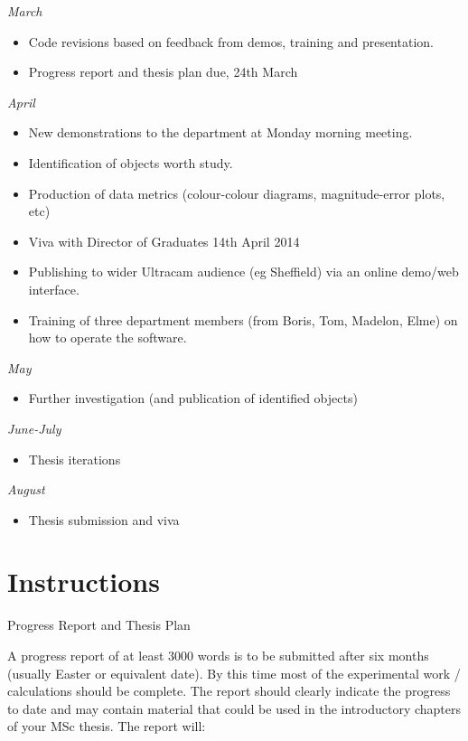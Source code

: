 \documentclass[a4paper,10pt]{article}
\begin{document}
\emph{March}
\begin{itemize} 
	\item Code revisions based on feedback from demos, training and presentation.
	\item Progress report and thesis plan due, 24th March
\end{itemize}

\emph{April}
\begin{itemize} 
	\item New demonstrations to the department at Monday morning meeting.
	\item Identification of objects worth study.
	\item Production of data metrics (colour-colour diagrams, magnitude-error plots, etc)
	\item Viva with Director of Graduates 14th April 2014
	\item Publishing to wider Ultracam audience (eg Sheffield) via an online demo/web interface.
	\item Training of three department members (from Boris, Tom, Madelon, Elme) on how to operate the software.
\end{itemize}
	
	
\emph{May}
\begin{itemize} 
	\item Further investigation (and publication of identified objects)
\end{itemize}

\emph{June-July}
\begin{itemize} 
	\item Thesis iterations
\end{itemize}
	
\emph{August}
\begin{itemize} 
	\item Thesis submission and viva
\end{itemize}
	

\section{Instructions}

Progress Report and Thesis Plan

A progress report of at least 3000 words is to be submitted after 
six months (usually Easter or equivalent date). By this time most of 
the experimental work / calculations should be complete. The report 
should clearly indicate the progress to date and may contain 
material that could be used in the introductory chapters of your MSc 
thesis. The report will:
\end{document}
